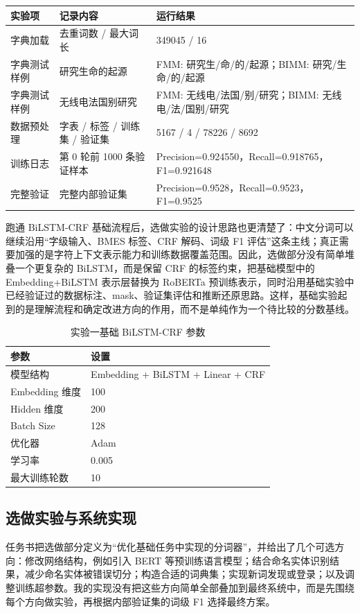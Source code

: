 \documentclass[12pt,a4paper,UTF8]{ctexart}
\newcommand{\xiaosi}{\fontsize{12pt}{18pt}\selectfont}
\newenvironment{reportbody}{\songti\xiaosi\onehalfspacing\sloppy}{}
\begin{document}
\begin{reportbody}
\begin{center}
  \begin{tabular}{C{30mm}C{42mm}C{58mm}}
    \toprule
    实验项 & 记录内容 & 运行结果 \\
    \midrule
    字典加载 & 去重词数 / 最大词长 & 349045 / 16 \\
    字典测试样例 & 研究生命的起源 & FMM: 研究生/命/的/起源；BIMM: 研究/生命/的/起源 \\
    字典测试样例 & 无线电法国别研究 & FMM: 无线电/法国/别/研究；BIMM: 无线电/法/国别/研究 \\
    数据预处理 & 字表 / 标签 / 训练集 / 验证集 & 5167 / 4 / 78226 / 8692 \\
    训练日志 & 第 0 轮前 1000 条验证样本 & Precision=0.924550，Recall=0.918765，F1=0.921648 \\
    完整验证 & 完整内部验证集 & Precision=0.9528，Recall=0.9523，F1=0.9525 \\
    \bottomrule
  \end{tabular}
\end{center}

跑通 BiLSTM-CRF 基础流程后，选做实验的设计思路也更清楚了：中文分词可以继续沿用“字级输入、BMES 标签、CRF 解码、词级 F1 评估”这条主线；真正需要加强的是字符上下文表示能力和训练数据覆盖范围。因此，选做部分没有简单堆叠一个更复杂的 BiLSTM，而是保留 CRF 的标签约束，把基础模型中的 Embedding+BiLSTM 表示层替换为 RoBERTa 预训练表示，同时沿用基础实验中已经验证过的数据标注、mask、验证集评估和推断还原思路。这样，基础实验起到的是理解流程和确定改进方向的作用，而不是单纯作为一个待比较的分数基线。

\begin{table}[htbp]
  \caption{实验一基础 BiLSTM-CRF 参数}
  \centering
  \begin{tabular}{C{42mm}C{85mm}}
    \toprule
    参数 & 设置 \\
    \midrule
    模型结构 & Embedding + BiLSTM + Linear + CRF \\
    Embedding 维度 & 100 \\
    Hidden 维度 & 200 \\
    Batch Size & 128 \\
    优化器 & Adam \\
    学习率 & 0.005 \\
    最大训练轮数 & 10 \\
    \bottomrule
  \end{tabular}
\end{table}

\subsection{选做实验与系统实现}
任务书把选做部分定义为“优化基础任务中实现的分词器”，并给出了几个可选方向：修改网络结构，例如引入 BERT 等预训练语言模型；结合命名实体识别结果，减少命名实体被错误切分；构造合适的词典集；实现新词发现或登录；以及调整训练超参数。我的实现没有把这些方向简单全部叠加到最终系统中，而是先围绕每个方向做实验，再根据内部验证集的词级 F1 选择最终方案。


\end{reportbody}
\end{document}
